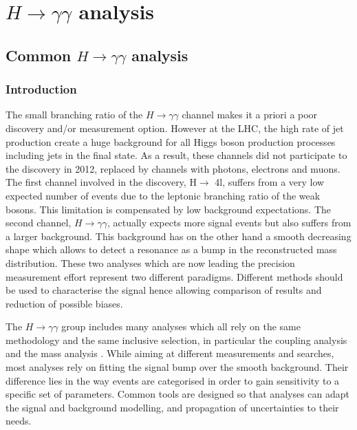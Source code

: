 \part{\(H\rightarrow\gamma\gamma\) analysis}
\label{sec:org3ff4562}

\label{HGam}

\chapter{Common \(H\rightarrow\gamma\gamma\) analysis}
\label{sec:orgb822321}

\section{Introduction}
\label{sec:org235a67d}
The small branching ratio of the $H\rightarrow\gamma\gamma$ channel makes it a priori a poor discovery and/or measurement option.
However at the LHC, the high rate of jet production create a huge background for all Higgs boson production processes including jets in the final state.
As a result, these channels did not participate to the discovery in 2012, replaced by channels with photons, electrons and muons.
The first channel involved in the discovery, H\(\rightarrow\) 4l, suffers from a very low expected number of events due to the leptonic branching ratio of the weak bosons.
This limitation is compensated by low background expectations.
The second channel, $H\rightarrow\gamma\gamma$, actually expects more signal events but also suffers from a larger background.
This background has on the other hand a smooth decreasing shape which allows to detect a resonance as a bump in the reconstructed mass distribution.
These two analyses which are now leading the precision measurement effort represent two different paradigms.
Different methods should be used to characterise the signal hence allowing comparison of results and reduction of possible biases.


The $H\rightarrow\gamma\gamma$ group includes many analyses which all rely on the same methodology and the same inclusive selection, in particular the coupling analysis \cite{ATLAS-CONF-2017-045} and the mass analysis \cite{ATLAS-CONF-2017-046}.
While aiming at different measurements and searches, most analyses rely on fitting the signal bump over the smooth background.
Their difference lies in the way events are categorised in order to gain sensitivity to a specific set of parameters.
Common tools are designed so that analyses can adapt the signal and background modelling, and propagation of uncertainties to their needs.

